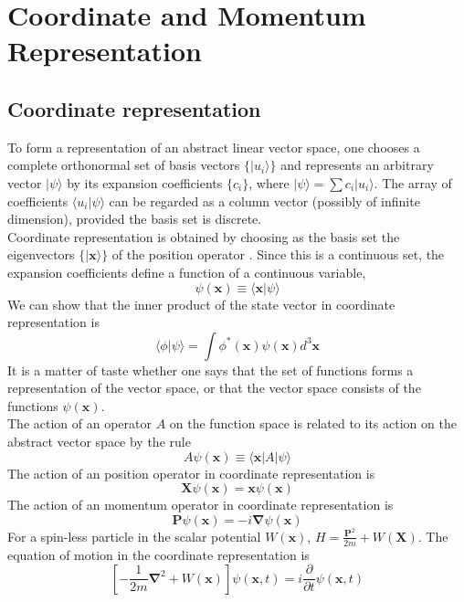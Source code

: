 \chapter{Coordinate and Momentum Representation}
\section{Coordinate representation}
To form a representation of an abstract linear vector space, one chooses a complete orthonormal set of basis vectors $\{|u_i\rangle\}$ and represents an arbitrary vector $|\psi\rangle$ by its expansion coefficients $\{c_i\}$, where $|\psi\rangle = \sum c_i |u_i\rangle$. 
The array of coefficients $\langle u_i | \psi \rangle$ can be regarded as a column vector (possibly of infinite dimension), provided the basis set is discrete.\\
Coordinate representation is obtained by choosing as the basis set the eigenvectors $\{|\bm{x}\rangle\}$ of the position operator . Since this is a continuous set, the expansion coefficients define a function of a continuous variable,
\[\psi(\bm{x})  \equiv \langle \bm{x} | \psi \rangle\]
We can show that the inner product of the state vector in coordinate representation is
\[\langle \phi | \psi \rangle = \int \phi^{*}(\bm{x})\psi(\bm{x}) d^3\bm{x} \]
It is a matter of taste whether one says that the set of functions forms a representation of the vector space, or that the vector space consists of the functions $\psi(\bm{x})$.\\
The action of an operator $A$ on the function space is related to its action on the abstract vector space by the rule
\[A \psi(\bm{x}) \equiv  \langle \bm{x} |A| \psi \rangle\]
The action of an position operator in coordinate representation is
\[\bm{X}\psi(\bm{x}) = \bm{x} \psi(\bm{x})\]
The action of an momentum operator in coordinate representation is
\[\bm{P}\psi(\bm{x}) = -i \bm{\nabla}\psi(\bm{x})\]
For a spin-less particle in the scalar potential $W(\bm{x})$,
$H = \frac{\bm{P}^2}{2m} + W(\bm{X})$. 
The equation of motion in the coordinate representation is
\[ \left[- \frac{1}{2m} \bm{\nabla}^2 + W(\bm{x}) \right] \psi(\bm{x},t) = i\frac{\partial}{\partial t}\psi(\bm{x},t)\]

